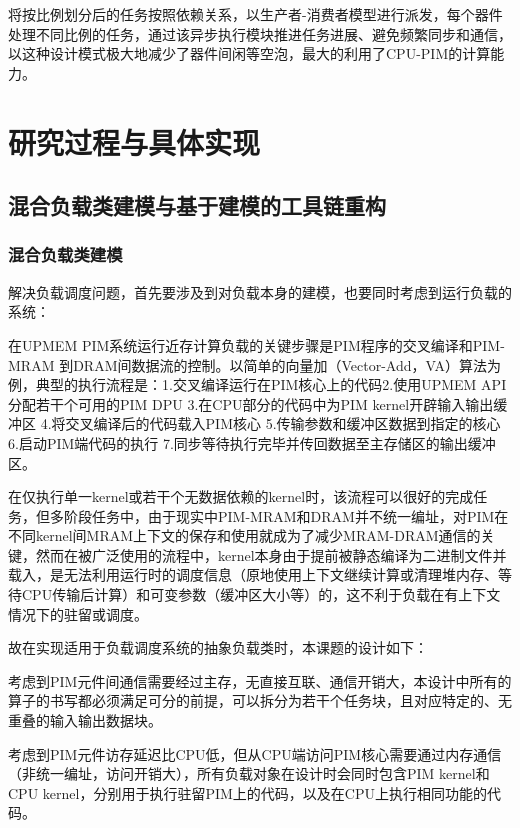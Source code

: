   将按比例划分后的任务按照依赖关系，以生产者-消费者模型进行派发，每个器件处理不同比例的任务，通过该异步执行模块推进任务进展、避免频繁同步和通信，以这种设计模式极大地减少了器件间闲等空泡，最大的利用了CPU-PIM的计算能力。

\section{研究过程与具体实现}\label{sec:research_procedure_and_implements}
  \subsection{混合负载类建模与基于建模的工具链重构}\label{subsec:load_abstraction_and_toolchain_refractor_impl}
    \subsubsection{混合负载类建模}\label{subsubsec:load_abstraction}
    解决负载调度问题，首先要涉及到对负载本身的建模，也要同时考虑到运行负载的系统：

    在UPMEM PIM系统运行近存计算负载的关键步骤是PIM程序的交叉编译和PIM-MRAM 到DRAM间数据流的控制。以简单的向量加（Vector-Add，VA）算法为例，典型的执行流程是：1.交叉编译运行在PIM核心上的代码2.使用UPMEM API分配若干个可用的PIM DPU 3.在CPU部分的代码中为PIM kernel开辟输入输出缓冲区 4.将交叉编译后的代码载入PIM核心 5.传输参数和缓冲区数据到指定的核心 6.启动PIM端代码的执行 7.同步等待执行完毕并传回数据至主存储区的输出缓冲区。

    在仅执行单一kernel或若干个无数据依赖的kernel时，该流程可以很好的完成任务，但多阶段任务中，由于现实中PIM-MRAM和DRAM并不统一编址，对PIM在不同kernel间MRAM上下文的保存和使用就成为了减少MRAM-DRAM通信的关键，然而在被广泛使用的流程中，kernel本身由于提前被静态编译为二进制文件并载入，是无法利用运行时的调度信息（原地使用上下文继续计算或清理堆内存、等待CPU传输后计算）和可变参数（缓冲区大小等）的，这不利于负载在有上下文情况下的驻留或调度。

    故在实现适用于负载调度系统的抽象负载类时，本课题的设计如下：

    考虑到PIM元件间通信需要经过主存，无直接互联、通信开销大，本设计中所有的算子的书写都必须满足可分的前提，可以拆分为若干个任务块，且对应特定的、无重叠的输入输出数据块。

    考虑到PIM元件访存延迟比CPU低，但从CPU端访问PIM核心需要通过内存通信（非统一编址，访问开销大），所有负载对象在设计时会同时包含PIM kernel和 CPU kernel，分别用于执行驻留PIM上的代码，以及在CPU上执行相同功能的代码。

